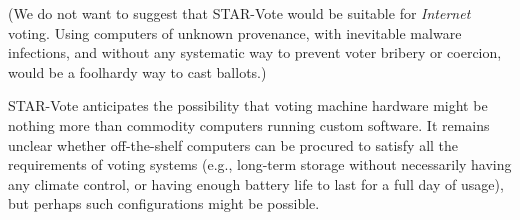 \documentclass[letterpaper, 10pt, twocolumn]{article}
\newcommand{\projname}{STAR-Vote\xspace}
\begin{document}
(We do not want to suggest that \projname
would be suitable for {\em Internet} voting. Using computers of
unknown provenance, with inevitable malware infections, and
without any systematic way to prevent voter bribery or coercion,
would be a foolhardy way to cast ballots.)

\projname anticipates the possibility that voting machine
hardware might be nothing more than commodity computers running custom
software. It remains unclear whether off-the-shelf computers can be
procured to satisfy all the requirements of voting systems (e.g.,
long-term storage without necessarily having any climate control, or
having enough battery life to last for a full day of usage), but
perhaps such configurations might be possible.






\end{document}
